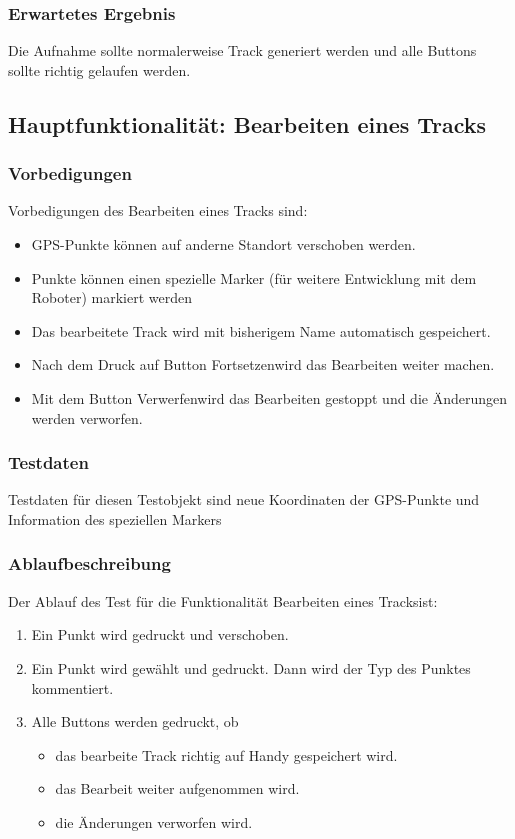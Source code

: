 \documentclass{article}
\begin{document}
\subsubsection{Erwartetes Ergebnis}
	Die Aufnahme sollte normalerweise Track generiert werden und alle Buttons sollte richtig gelaufen werden.

\subsection{Hauptfunktionalität: Bearbeiten eines Tracks}
\subsubsection{Vorbedigungen}
	Vorbedigungen des Bearbeiten eines Tracks sind:
	\begin{itemize}
		\item GPS-Punkte können auf anderne Standort verschoben werden.
		\item Punkte können einen spezielle Marker (für weitere Entwicklung mit dem Roboter) markiert werden
		\item Das bearbeitete Track wird mit bisherigem Name automatisch gespeichert.
		\item Nach dem Druck auf Button \glqq Fortsetzen\grqq wird das Bearbeiten weiter machen.
		\item Mit dem Button \glqq Verwerfen\grqq wird das Bearbeiten gestoppt und die Änderungen werden verworfen.		
	\end{itemize}
\subsubsection{Testdaten}
	Testdaten für diesen Testobjekt sind neue Koordinaten der GPS-Punkte und Information des speziellen Markers
\subsubsection{Ablaufbeschreibung}
	Der Ablauf des Test für die Funktionalität \glqq Bearbeiten eines Tracks\grqq ist:
	\begin{enumerate}
		\item Ein Punkt wird gedruckt und verschoben.
		\item Ein Punkt wird gewählt und gedruckt. Dann wird der Typ des Punktes kommentiert.
		\item Alle Buttons werden gedruckt, ob
			\begin{itemize}
				\item das bearbeite Track richtig auf Handy gespeichert wird.
				\item das Bearbeit weiter aufgenommen wird.
				\item die Änderungen verworfen wird.
			\end{itemize}
	\end{enumerate}
\end{document}
